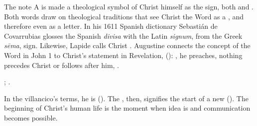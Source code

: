 The note A is made a theological symbol of Christ himself as the sign, both
 and .
Both words draw on theological traditions that see Christ the Word as a
, and therefore even as a letter.
In his 1611 Spanish dictionary Sebastián de Covarrubias glosses the Spanish
\emph{divisa} with the Latin \emph{signum}, from the Greek \emph{sēma}, sign. 
Likewise, Lapide calls Christ .%
    \Autocites
    []{Covarrubias:Tesoro}
    [685--686, on Lk 2]{Lapide:Gospels19C}
Augustine connects the concept of the Word in John 1 to Christ's statement in
Revelation,  (): , he preaches, nothing precedes Christ or follows after
him, .%
\begin{Footnote}
    ;
    \autocite[on Rv 1]{Lapide:Apocalypse1627}.
\end{Footnote}
In the villancico's terms, he is 
().
The , then, signifies the start of a new 
().
The beginning of Christ's human life is the moment when idea is  and communication becomes possible.


